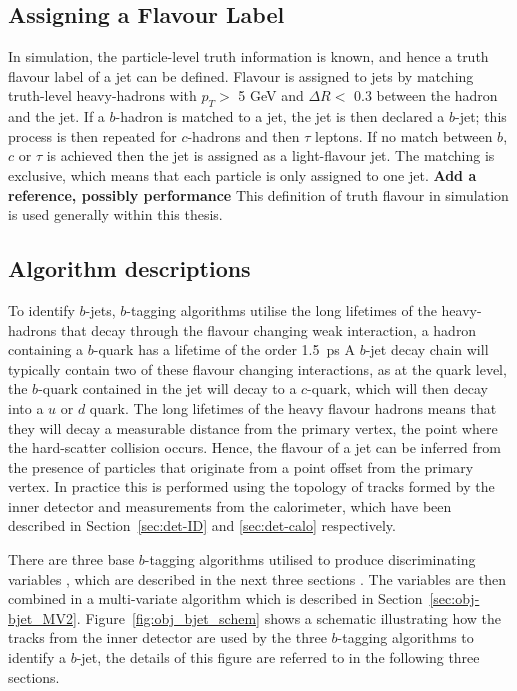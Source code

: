 \subsection{Assigning a Flavour Label}
\label{sec:obj-bjet_label}

In simulation, the particle-level truth information is known, and hence a truth flavour label of a jet can be defined.
Flavour is assigned to jets by matching truth-level heavy-hadrons with $p_{T} >$ 5 GeV and $\Delta R <$ 0.3 between the hadron and the jet.
If a $b$-hadron is matched to a jet, the jet is then declared a $b$-jet;
this process is then repeated for $c$-hadrons and then $\tau$ leptons.
If no match between $b$, $c$ or $\tau$ is achieved then the jet is assigned as a light-flavour jet.
The matching is exclusive, which means that each particle is only assigned to one jet. \textbf{Add a reference, possibly performance}
This definition of truth flavour in simulation is used generally within this thesis.
   
\subsection{Algorithm descriptions}

To identify $b$-jets, $b$-tagging algorithms utilise the long lifetimes of the heavy-hadrons that decay through the flavour changing weak interaction,
a hadron containing a $b$-quark has a lifetime of the order \SI{1.5}{\pico\second} %
A $b$-jet decay chain  will typically contain two of these flavour changing interactions, 
as at the quark level, the $b$-quark contained in the jet will decay to a $c$-quark, which will then decay into a $u$ or $d$ quark.
The long lifetimes of the heavy flavour hadrons means that they will decay a measurable distance from the 
primary vertex, the point where the hard-scatter collision occurs.
Hence, the flavour of a jet can be inferred from the presence of particles
that originate from a point offset from the primary vertex.
In practice this is performed using the topology of tracks formed by the inner detector
and measurements from the calorimeter, which have been described in Section~\ref{sec:det-ID} and \ref{sec:det-calo} respectively.
   
There are three base $b$-tagging algorithms utilised to produce discriminating variables \cite{obj-bjet_algo_2016}, which are described in the next three sections .
The variables are then combined in a multi-variate algorithm which is described in Section~\ref{sec:obj-bjet_MV2}.
Figure~\ref{fig:obj_bjet_schem} shows a schematic illustrating how the tracks from the inner detector
are used by the three $b$-tagging algorithms to identify a $b$-jet, the details of this figure are referred to in the following three sections.

